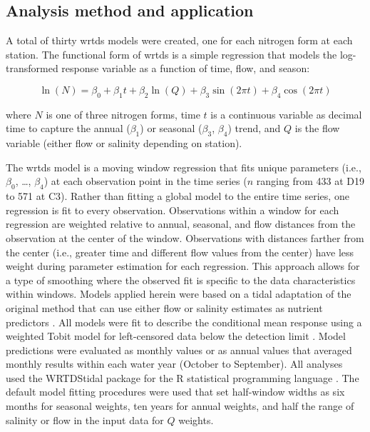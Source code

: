 \documentclass[letterpaper,12pt,oneside]{article}\usepackage[]{graphicx}\usepackage[]{color}
\begin{document}
\subsection{Analysis method and application}

A total of thirty \ac{wrtds} models were created, one for each nitrogen form at each station.  The functional form of \ac{wrtds} is a simple regression \citep{Hirsch10} that models the log-transformed response variable as a function of time, flow, and season:

\begin{equation}
\ln\left(N\right) = \beta_0 + \beta_1 t + \beta_2 \ln\left(Q\right) + \beta_3 \sin\left(2\pi t\right) + \beta_4 \cos\left(2\pi t\right)
\end{equation}  



\noindent where $N$ is one of three nitrogen forms, time $t$ is a continuous variable as decimal time to capture the annual ($\beta_1$) or seasonal ($\beta_3$, $\beta_4$) trend, and $Q$ is the flow variable (either flow or salinity depending on station).  

The \ac{wrtds} model is a moving window regression that fits unique parameters (i.e., $\beta_0$, \ldots, $\beta_4$) at each observation point in the time series ($n$ ranging from 433 at D19 to 571 at C3).  Rather than fitting a global model to the entire time series, one regression is fit to every observation.  Observations within a window for each regression are weighted relative to annual, seasonal, and flow distances from the observation at the center of the window.  Observations with distances farther from the center (i.e., greater time and different flow values from the center) have less weight during parameter estimation for each regression.  This approach allows for a type of smoothing where the observed fit is specific to the data characteristics within windows. Models applied herein were based on a tidal adaptation of the original method that can use either flow or salinity estimates as nutrient predictors \citep{Beck15}.  All models were fit to describe the conditional mean response using a weighted Tobit model for left-censored data below the detection limit \citep{Tobin58}.  Model predictions were evaluated as monthly values or as annual values that averaged monthly results within each water year (October to September). All analyses used the WRTDStidal package for the R statistical programming language \citep{Beck17b,RDCT17}.  The default model fitting procedures were used that set half-window widths as six months for seasonal weights, ten years for annual weights, and half the range of salinity or flow in the input data for $Q$ weights.
\end{document}
